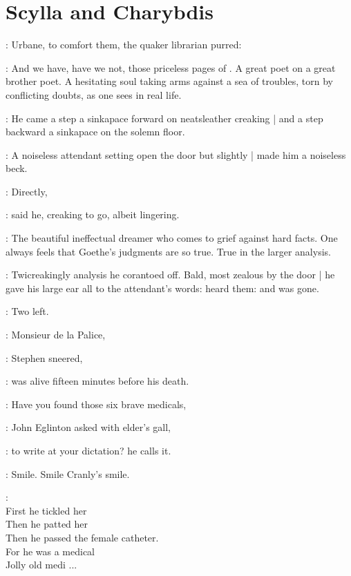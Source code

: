 \section*{Scylla and Charybdis}

:
Urbane, to comfort them,
the quaker librarian purred:

\librarian:
And we have, have we not, those priceless pages of .
A great poet on a great brother poet.
A hesitating soul taking arms against a sea of troubles,
torn by conflicting doubts,
as one sees in real life.

:
He came a step a sinkapace forward
on neatsleather creaking |
and a step backward a sinkapace
on the solemn floor.

:
A noiseless attendant setting open the door but slightly |
made him a noiseless beck.

\librarian:
Directly,

:
said he,
creaking to go, albeit lingering.

\librarian:
The beautiful ineffectual dreamer who comes to grief against hard facts.
One always feels that Goethe's judgments are so true.
True in the larger analysis.

:
Twicreakingly analysis he corantoed off.
Bald, most zealous by the door |
he gave his large ear all to the attendant's words:
heard them: and was gone.

\StephenInt:
Two left.

\Stephen:
Monsieur de la Palice,

:
Stephen sneered,

\Stephen:
was alive fifteen minutes before his death.

\eglinton:
Have you found those six brave medicals,

:
John Eglinton asked with elder's gall,

\eglinton:
to write  at your dictation?
he calls it.

\StephenInt:
Smile. Smile Cranly's smile.

\StephenInt: \\
    First he tickled her \\
    Then he patted her \\
    Then he passed the female catheter. \\
    For he was a medical \\
    Jolly old medi ... \\


